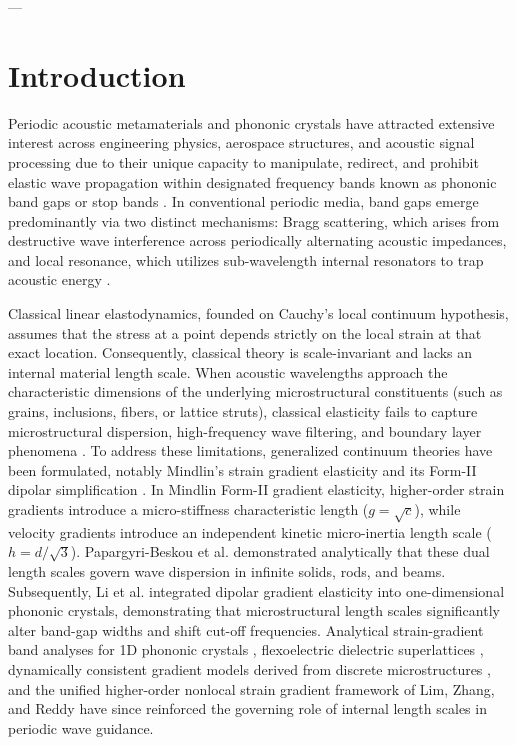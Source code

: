 \documentclass[11pt,a4paper]{article}
\begin{document}
---

\section{Introduction}
\label{sec:intro}

Periodic acoustic metamaterials and phononic crystals have attracted extensive interest across engineering physics, aerospace structures, and acoustic signal processing due to their unique capacity to manipulate, redirect, and prohibit elastic wave propagation within designated frequency bands known as phononic band gaps or stop bands \cite{kushwaha1993acoustic,hussein2014dynamics,brillouin1953wave}. In conventional periodic media, band gaps emerge predominantly via two distinct mechanisms: Bragg scattering, which arises from destructive wave interference across periodically alternating acoustic impedances, and local resonance, which utilizes sub-wavelength internal resonators to trap acoustic energy \cite{hussein2014dynamics}.

Classical linear elastodynamics, founded on Cauchy's local continuum hypothesis, assumes that the stress at a point depends strictly on the local strain at that exact location. Consequently, classical theory is scale-invariant and lacks an internal material length scale. When acoustic wavelengths approach the characteristic dimensions of the underlying microstructural constituents (such as grains, inclusions, fibers, or lattice struts), classical elasticity fails to capture microstructural dispersion, high-frequency wave filtering, and boundary layer phenomena \cite{achenbach1973wave}. To address these limitations, generalized continuum theories have been formulated, notably Mindlin's strain gradient elasticity \cite{mindlin1964microstructure,mindlin1965second} and its Form-II dipolar simplification \cite{askes2011gradient,georgiadis2003wedge,polyzos2003boundary}. In Mindlin Form-II gradient elasticity, higher-order strain gradients introduce a micro-stiffness characteristic length ($g = \sqrt{c}$), while velocity gradients introduce an independent kinetic micro-inertia length scale ($h = d/\sqrt{3}$). Papargyri-Beskou et al. \cite{papargyribeskou2009wave} demonstrated analytically that these dual length scales govern wave dispersion in infinite solids, rods, and beams. Subsequently, Li et al. \cite{li2016band} integrated dipolar gradient elasticity into one-dimensional phononic crystals, demonstrating that microstructural length scales significantly alter band-gap widths and shift cut-off frequencies. Analytical strain-gradient band analyses for 1D phononic crystals \cite{hosseini2024strain}, flexoelectric dielectric superlattices \cite{li2024flexoelectric}, dynamically consistent gradient models derived from discrete microstructures \cite{metrikine2002dynamically}, and the unified higher-order nonlocal strain gradient framework of Lim, Zhang, and Reddy \cite{lim2015higher} have since reinforced the governing role of internal length scales in periodic wave guidance.
\end{document}
